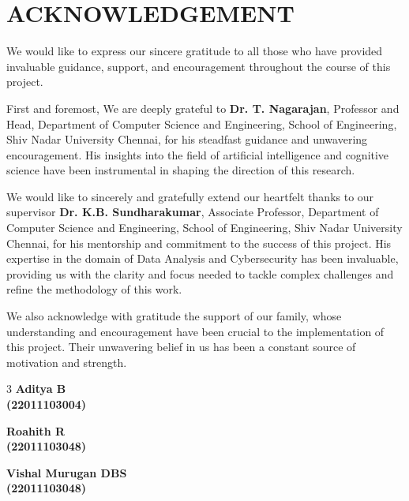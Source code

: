 \documentclass[a4paper, 12pt]{extreport}
\begin{document}


\chapter*{\LARGE ACKNOWLEDGEMENT}
\justify\doublespacing
We would like to express our sincere gratitude to all those who have provided invaluable guidance, support, and encouragement throughout the course of this project.
 
First and foremost, We are deeply grateful to \textbf{Dr. T. Nagarajan}, Professor and Head, Department of Computer Science and Engineering, School of Engineering, Shiv Nadar University Chennai, for his steadfast guidance and unwavering encouragement. His insights into the field of artificial intelligence and cognitive science have been instrumental in shaping the direction of this research. %
 
\indent We would like to sincerely and gratefully extend our heartfelt thanks to our supervisor \newline
\textbf{Dr. K.B. Sundharakumar}, Associate Professor, Department of Computer Science and Engineering, School of Engineering, Shiv Nadar University Chennai, for his mentorship and commitment to the success of this project. His expertise in the domain of Data Analysis  and Cybersecurity has been invaluable, providing us with the clarity and focus needed to tackle complex challenges and refine the methodology of this work.               


We also acknowledge with gratitude the support of our family, whose understanding and encouragement have been crucial to the implementation of this project. Their unwavering belief in us has been a constant source of motivation and strength.

\vspace{1.0cm}                      
\begin{multicols}{3}  %
\centering
\textbf{Aditya B}\\
\textbf{(22011103004)}\\
\vspace{0.1cm}


\textbf{Roahith R}\\
\textbf{(22011103048)}\\
\vspace{0.1cm}


\textbf{Vishal Murugan DBS}\\
\textbf{(22011103048)}\\
\vspace{0.1cm}

\end{multicols}
\end{document}
